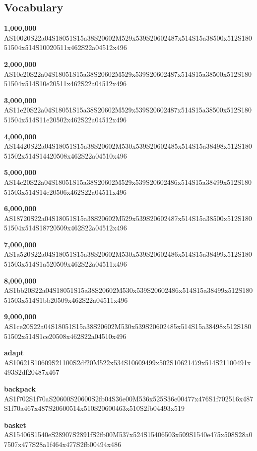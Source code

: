 \documentclass{article}
\begin{document}
\subsection{Vocabulary}

\begin{glossary}

\textbf{1,000,000}\\
AS10020S22a04S18051S15a38S20602M529x539S20602487x514S15a38500x512S18051504x514S10020511x462S22a04512x496

\textbf{2,000,000}\\
AS10e20S22a04S18051S15a38S20602M529x539S20602487x514S15a38500x512S18051504x514S10e20511x462S22a04512x496

\textbf{3,000,000}\\
AS11e20S22a04S18051S15a38S20602M529x539S20602487x514S15a38500x512S18051504x514S11e20502x462S22a04512x496

\textbf{4,000,000}\\
AS14420S22a04S18051S15a38S20602M530x539S20602485x514S15a38498x512S18051502x514S14420508x462S22a04510x496

\textbf{5,000,000}\\
AS14c20S22a04S18051S15a38S20602M529x539S20602486x514S15a38499x512S18051503x514S14c20506x462S22a04511x496

\textbf{6,000,000}\\
AS18720S22a04S18051S15a38S20602M529x539S20602487x514S15a38500x512S18051504x514S18720509x462S22a04512x496

\textbf{7,000,000}\\
AS1a520S22a04S18051S15a38S20602M530x539S20602486x514S15a38499x512S18051503x514S1a520509x462S22a04511x496

\textbf{8,000,000}\\
AS1bb20S22a04S18051S15a38S20602M530x539S20602486x514S15a38499x512S18051503x514S1bb20509x462S22a04511x496

\textbf{9,000,000}\\
AS1ce20S22a04S18051S15a38S20602M530x539S20602485x514S15a38498x512S18051502x514S1ce20508x462S22a04510x496

\textbf{adapt}\\
AS10621S10609S21100S2df20M522x534S10609499x502S10621479x514S21100491x493S2df20487x467

\textbf{backpack}\\
AS1f702S1f70aS20600S20600S2fb04S36e00M536x525S36e00477x476S1f702516x487S1f70a467x487S20600514x510S20600463x510S2fb04493x519

\textbf{basket}\\
AS15406S1540eS28907S2891fS2fb00M537x524S15406503x509S1540e475x508S28a07507x477S28a1f464x477S2fb00494x486


\end{glossary}
\end{document}
